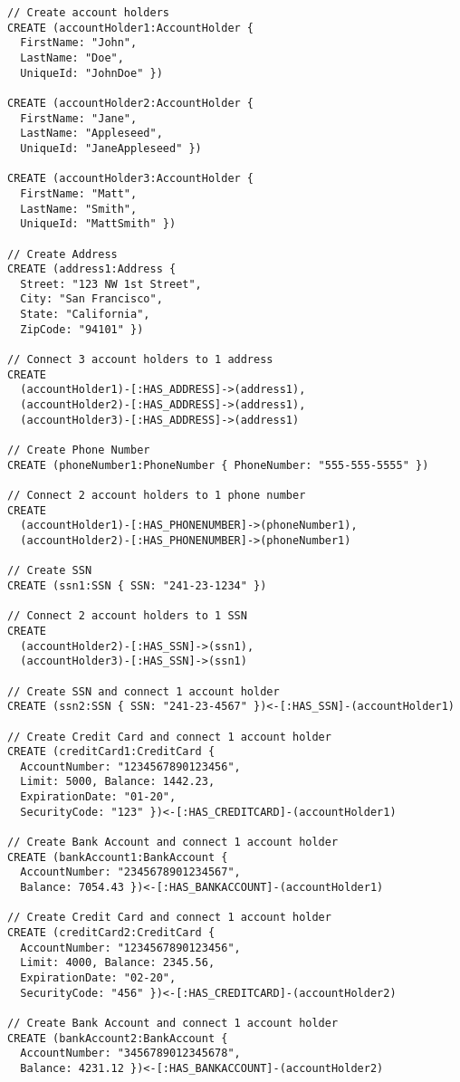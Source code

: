 \begin{lstlisting}
// Create account holders
CREATE (accountHolder1:AccountHolder {
  FirstName: "John",
  LastName: "Doe",
  UniqueId: "JohnDoe" })

CREATE (accountHolder2:AccountHolder {
  FirstName: "Jane",
  LastName: "Appleseed",
  UniqueId: "JaneAppleseed" })

CREATE (accountHolder3:AccountHolder {
  FirstName: "Matt",
  LastName: "Smith",
  UniqueId: "MattSmith" })

// Create Address
CREATE (address1:Address {
  Street: "123 NW 1st Street",
  City: "San Francisco",
  State: "California",
  ZipCode: "94101" })

// Connect 3 account holders to 1 address
CREATE
  (accountHolder1)-[:HAS_ADDRESS]->(address1),
  (accountHolder2)-[:HAS_ADDRESS]->(address1),
  (accountHolder3)-[:HAS_ADDRESS]->(address1)

// Create Phone Number
CREATE (phoneNumber1:PhoneNumber { PhoneNumber: "555-555-5555" })

// Connect 2 account holders to 1 phone number
CREATE
  (accountHolder1)-[:HAS_PHONENUMBER]->(phoneNumber1),
  (accountHolder2)-[:HAS_PHONENUMBER]->(phoneNumber1)

// Create SSN
CREATE (ssn1:SSN { SSN: "241-23-1234" })

// Connect 2 account holders to 1 SSN
CREATE
  (accountHolder2)-[:HAS_SSN]->(ssn1),
  (accountHolder3)-[:HAS_SSN]->(ssn1)

// Create SSN and connect 1 account holder
CREATE (ssn2:SSN { SSN: "241-23-4567" })<-[:HAS_SSN]-(accountHolder1)

// Create Credit Card and connect 1 account holder
CREATE (creditCard1:CreditCard {
  AccountNumber: "1234567890123456",
  Limit: 5000, Balance: 1442.23,
  ExpirationDate: "01-20",
  SecurityCode: "123" })<-[:HAS_CREDITCARD]-(accountHolder1)

// Create Bank Account and connect 1 account holder
CREATE (bankAccount1:BankAccount {
  AccountNumber: "2345678901234567",
  Balance: 7054.43 })<-[:HAS_BANKACCOUNT]-(accountHolder1)

// Create Credit Card and connect 1 account holder
CREATE (creditCard2:CreditCard {
  AccountNumber: "1234567890123456",
  Limit: 4000, Balance: 2345.56,
  ExpirationDate: "02-20",
  SecurityCode: "456" })<-[:HAS_CREDITCARD]-(accountHolder2)

// Create Bank Account and connect 1 account holder
CREATE (bankAccount2:BankAccount {
  AccountNumber: "3456789012345678",
  Balance: 4231.12 })<-[:HAS_BANKACCOUNT]-(accountHolder2)


\end{lstlisting}
